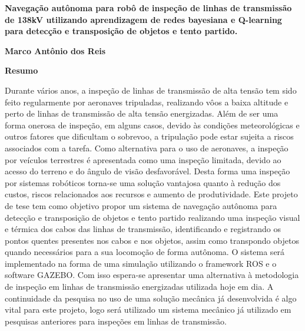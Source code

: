 \newpage
\thispagestyle{empty}
\begin{center}
  \textbf{\Large Navegação autônoma para robô de inspeção de linhas de transmissão de 138kV utilizando aprendizagem de redes bayesiana e Q-learning para detecção e transposição de objetos e tento partido.
  }

  \vspace*{1cm}
  \textbf{\large Marco Antônio dos Reis}

  \vspace*{2cm}

  \textbf{\large Resumo}
\end{center}
Durante vários anos, a inspeção de linhas de transmissão de alta tensão tem sido feito regularmente por aeronaves tripuladas, realizando vôos a baixa altitude e perto de linhas de transmissão de alta tensão energizadas. Além de ser uma forma onerosa de inspeção, em alguns casos, devido às condições meteorológicas e outros fatores que dificultam o sobrevoo, a tripulação pode estar sujeita a riscos associados com a tarefa. Como alternativa para o uso de aeronaves, a inspeção por veículos terrestres é apresentada como uma inspeção limitada, devido ao acesso do terreno e do ângulo de visão desfavorável. Desta forma uma inspeção por sistemas robóticos torna-se uma solução vantajosa quanto à redução dos custos, riscos relacionados aos recursos e aumento de produtividade. Este projeto de tese tem como objetivo propor um sistema de navegação autônoma para detecção e transposição de objetos e tento partido realizando uma inspeção visual e térmica dos cabos das linhas de transmissão, identificando e registrando os pontos quentes presentes nos cabos e nos objetos, assim como transpondo objetos quando necessários para a sua locomoção de forma autônoma. O sistema será implementado na forma de uma simulação utilizando o framework ROS e o software GAZEBO. Com isso espera-se apresentar uma alternativa à metodologia de inspeção em linhas de transmissão energizadas utilizada hoje em dia. A continuidade da pesquisa no uso de uma solução mecânica já desenvolvida é algo vital para este projeto, logo será utilizado um sistema mecânico já utilizado em pesquisas anteriores para inspeções em linhas de transmissão.

